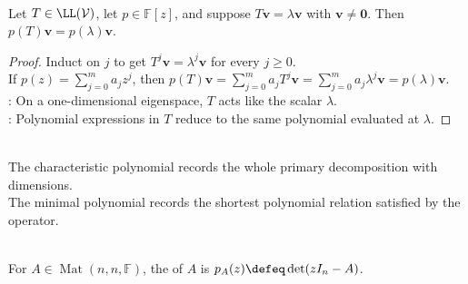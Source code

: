 \begin{proposition} \label{prop:polynomial-eigenvector-evaluation} \\
Let $T\in\LL(\mathcal{V})$, let $p\in\mathbb{F}[z]$, and suppose $T\mathbf{v}=\lambda\mathbf{v}$ with $\mathbf{v}\neq\mathbf{0}$. Then $p(T)\mathbf{v}=p(\lambda)\mathbf{v}$.
\begin{proof}
Induct on $j$ to get $T^j\mathbf{v}=\lambda^j\mathbf{v}$ for every $j\geq0$.\\
If $p(z)=\sum\limits_{j=0}^{m}a_jz^j$, then $p(T)\mathbf{v} =\sum\limits_{j=0}^{m}a_jT^j\mathbf{v} =\sum\limits_{j=0}^{m}a_j\lambda^j\mathbf{v} =p(\lambda)\mathbf{v}$.\\
: On a one-dimensional eigenspace, $T$ acts like the scalar $\lambda$.\\
: Polynomial expressions in $T$ reduce to the same polynomial evaluated at $\lambda$.
\end{proof}
\end{proposition}

\begin{motivation} \label{mot:characteristic-and-minimal-polynomials} \\
The characteristic polynomial records the whole primary decomposition with dimensions.\\
The minimal polynomial records the shortest polynomial relation satisfied by the operator.
\end{motivation}

\begin{definition} \label{def:matrix-characteristic-polynomial} \\
For $A\in\operatorname{Mat}(n,n,\mathbb{F})$, the  of $A$ is $p_A(z)\defeq\det(zI_n-A)$.
\end{definition}

